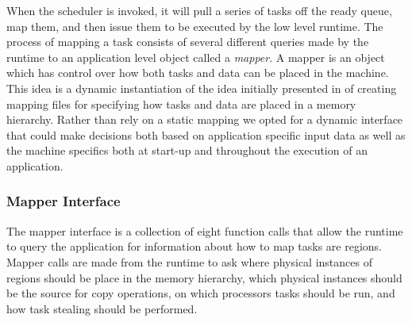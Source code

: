 When the scheduler is invoked, it will pull a series of tasks off the ready queue, map them,
and then issue them to be executed by the low level runtime.  The process of mapping a task
consists of several different queries made by the runtime to an application level object
called a {\em mapper}.  A mapper is an object which has control over how both tasks and
data can be placed in the machine.  This idea is a dynamic instantiation of the idea
initially presented in \cite{Fatahalian06} of creating mapping files for specifying how
tasks and data are placed in a memory hierarchy.  Rather than rely on a static mapping
we opted for a dynamic interface that could make decisions both based on application specific
input data as well as the machine specifics both at start-up and throughout the execution
of an application.  %


\subsubsection{Mapper Interface}
The mapper interface is a collection of eight function calls that allow the runtime to query
the application for information about how to map tasks are regions.  Mapper calls are made
from the runtime to ask where physical instances of regions should be place in the memory hierarchy,
which physical instances should be the source for copy operations, on which processors
tasks should be run, and how task stealing should be performed.




